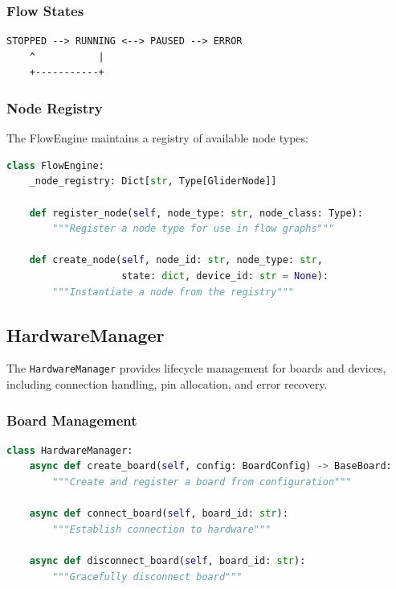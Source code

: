 \documentclass[11pt,a4paper]{article}
\begin{document}
\subsubsection{Flow States}

\begin{verbatim}
STOPPED --> RUNNING <--> PAUSED --> ERROR
    ^           |
    +-----------+
\end{verbatim}

\subsubsection{Node Registry}

The FlowEngine maintains a registry of available node types:

\begin{lstlisting}[language=Python]
class FlowEngine:
    _node_registry: Dict[str, Type[GliderNode]]

    def register_node(self, node_type: str, node_class: Type):
        """Register a node type for use in flow graphs"""

    def create_node(self, node_id: str, node_type: str,
                    state: dict, device_id: str = None):
        """Instantiate a node from the registry"""
\end{lstlisting}

\subsection{HardwareManager}

The \texttt{HardwareManager} provides lifecycle management for boards and devices, including connection handling, pin allocation, and error recovery.

\subsubsection{Board Management}

\begin{lstlisting}[language=Python]
class HardwareManager:
    async def create_board(self, config: BoardConfig) -> BaseBoard:
        """Create and register a board from configuration"""

    async def connect_board(self, board_id: str):
        """Establish connection to hardware"""

    async def disconnect_board(self, board_id: str):
        """Gracefully disconnect board"""
\end{lstlisting}
\end{document}

